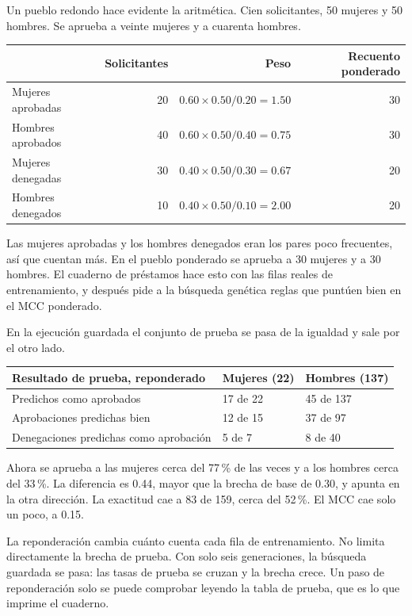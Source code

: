 \documentclass[11pt]{article}
\newcommand{\pct}[1]{\mbox{#1\,\%}}
\begin{document}
Un pueblo redondo hace evidente la aritmética. Cien solicitantes, 50 mujeres y 50 hombres. Se aprueba a veinte mujeres y a cuarenta hombres.

\begin{table}[H]
\centering
\small
\begin{tabular}{@{}l r r r@{}}
\toprule
 & Solicitantes & Peso & Recuento ponderado \\
\midrule
Mujeres aprobadas & 20 & \(0.60 \times 0.50 / 0.20 = 1.50\) & 30 \\
Hombres aprobados & 40 & \(0.60 \times 0.50 / 0.40 = 0.75\) & 30 \\
Mujeres denegadas & 30 & \(0.40 \times 0.50 / 0.30 = 0.67\) & 20 \\
Hombres denegados & 10 & \(0.40 \times 0.50 / 0.10 = 2.00\) & 20 \\
\bottomrule
\end{tabular}
\end{table}

\noindent
Las mujeres aprobadas y los hombres denegados eran los pares poco frecuentes, así que cuentan más. En el pueblo ponderado se aprueba a 30 mujeres y a 30 hombres. El cuaderno de préstamos hace esto con las filas reales de entrenamiento, y después pide a la búsqueda genética reglas que puntúen bien en el MCC ponderado.

En la ejecución guardada el conjunto de prueba se pasa de la igualdad y sale por el otro lado.

\begin{table}[H]
\centering
\small
\begin{tabularx}{\textwidth}{@{}l Y Y@{}}
\toprule
Resultado de prueba, reponderado & Mujeres (22) & Hombres (137) \\
\midrule
Predichos como aprobados & 17 de 22 & 45 de 137 \\
Aprobaciones predichas bien & 12 de 15 & 37 de 97 \\
Denegaciones predichas como aprobación & 5 de 7 & 8 de 40 \\
\bottomrule
\end{tabularx}
\end{table}

Ahora se aprueba a las mujeres cerca del \pct{77} de las veces y a los hombres cerca del \pct{33}. La diferencia es 0.44, mayor que la brecha de base de 0.30, y apunta en la otra dirección. La exactitud cae a 83 de 159, cerca del \pct{52}. El MCC cae solo un poco, a 0.15.

\begin{idea}
La reponderación cambia cuánto cuenta cada fila de entrenamiento. No limita directamente la brecha de prueba. Con solo seis generaciones, la búsqueda guardada se pasa: las tasas de prueba se cruzan y la brecha crece. Un paso de reponderación solo se puede comprobar leyendo la tabla de prueba, que es lo que imprime el cuaderno.
\end{idea}
\end{document}
